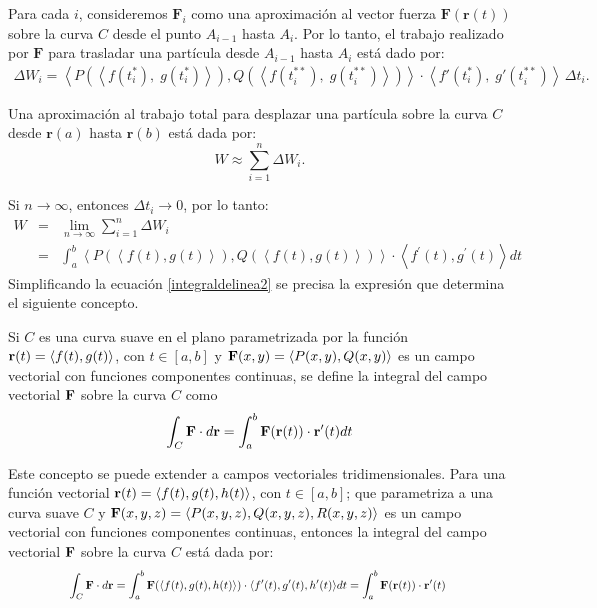 Para cada $i$, consideremos $\mathbf{F}_i$ como una aproximación al vector fuerza
$\mathbf{F}(\mathbf{r}(t))$ sobre la curva $C$ desde el punto $A_{i-1}$ hasta $A_i$. Por lo tanto, el trabajo realizado por $\mathbf{F}$ para trasladar una partícula desde $A_{i-1}$ hasta $A_i$ está dado por:
\begin{gather*}
  \Delta W_i =
  \left\langle
  P\left( \left\langle f(t_i^{\ast}),\; g(t_i^{\ast}) \right\rangle \right),
  Q\left( \left\langle f(t_i^{\ast\ast}),\; g(t_i^{\ast\ast}) \right\rangle \right)
  \right\rangle \cdot
  \left\langle f'(t_i^{\ast}),\; g'(t_i^{\ast\ast}) \right\rangle \,
  \Delta t_i.
\end{gather*}

Una aproximación al trabajo total para desplazar una partícula sobre la curva $C$ desde $\mathbf{r}(a)$ hasta $\mathbf{r}(b)$ está dada por:
\[
  W \approx \sum_{i=1}^{n} \Delta W_i.
\]

Si $n \to \infty$, entonces $\Delta t_i \to 0$, por lo tanto:
\begin{eqnarray}
  W &=& \lim_{n\rightarrow\infty}\sum_{i=1}^{n}\Delta W_{i} \nonumber \\
  &=& \int_{a}^{b}\left\langle P\left( \left\langle f(t) ,g\left(t\right) \right\rangle \right) ,Q\left( \left\langle f(t)
  ,g(t) \right\rangle \right) \right\rangle \cdot \left\langle f^{\prime }(t) ,g^{\prime }(t) \right\rangle dt \label{integraldelinea2}
\end{eqnarray}
Simplificando la ecuación \ref{integraldelinea2} se precisa la expresión que determina el siguiente concepto.

\begin{defi}
  Si $C$ es una curva suave en el plano parametrizada por la función ${\bf r}(t)=\langle f(t),g(t)\rangle$, con $t \in [a,b]$
  y ${\bf F}(x,y)= \langle P(x,y),Q(x,y)\rangle $ es un campo vectorial con funciones componentes continuas, se define la integral del campo vectorial ${\bf F}$ sobre la curva $C$ como
  \begin{equation} \label{integraldelinea3}
    \int_C {\bf F} \cdot d {\bf r} =\int_{a}^{b}{\bf F}({\bf r}(t)) \cdot {\bf r}^{\prime }(t) dt
  \end{equation} 
\end{defi}

Este concepto se puede extender a campos vectoriales tridimensionales. Para una función vectorial
{\small ${\bf r}(t)=\langle f(t),g(t),h(t)\rangle$,} con {\small $t \in [a,b]$;}
que parametriza a una curva suave $C$ y {\footnotesize ${\bf F}(x,y,z)= \langle P(x,y,z),Q(x,y,z), R(x,y,z)\rangle$} es un campo vectorial con funciones componentes continuas, entonces la integral del campo vectorial ${\bf F}$ sobre la curva $C$ está dada por:
\begin{equation}\label{integraldelinea7}
  \scalebox{0.82}{%
    $\displaystyle \int_C {\bf F} \cdot d {\bf r} =\int_{a}^{b}{\bf F}(\langle f(t),g(t),h(t)\rangle) \cdot \langle f'(t),g'(t),h'(t)\rangle dt =\int_{a}^{b}{\bf F}({\bf r}(t)) \cdot {\bf r}^{\prime }(t)$
  }
\end{equation}

